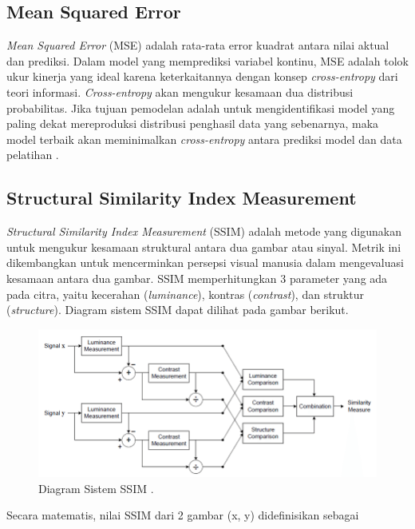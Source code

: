 \subsection{Mean Squared Error}
\label{subsec:MSE}

\emph{Mean Squared Error} (MSE) adalah rata-rata error kuadrat antara nilai aktual dan prediksi. 
Dalam model yang memprediksi variabel kontinu, MSE adalah tolok ukur kinerja yang ideal karena keterkaitannya dengan konsep \emph{cross-entropy} dari teori informasi. 
\emph{Cross-entropy} akan mengukur kesamaan dua distribusi probabilitas. 
Jika tujuan pemodelan adalah untuk mengidentifikasi model yang paling dekat mereproduksi distribusi penghasil data yang sebenarnya, maka model terbaik akan meminimalkan \emph{cross-entropy} antara prediksi model dan data pelatihan \parencite{MSE}. 

\subsection{Structural Similarity Index Measurement}
\label{subsec:SSIM}

\emph{Structural Similarity Index Measurement} (SSIM) adalah metode yang digunakan untuk mengukur kesamaan struktural antara dua gambar atau sinyal. 
Metrik ini dikembangkan untuk mencerminkan persepsi visual manusia dalam mengevaluasi kesamaan antara dua gambar. 
SSIM memperhitungkan 3 parameter yang ada pada citra, yaitu kecerahan (\emph{luminance}), kontras (\emph{contrast}), dan struktur (\emph{structure}). 
Diagram sistem SSIM dapat dilihat pada gambar berikut.

\begin{figure}[ht]
  \centering
  \includegraphics[scale=0.5]{gambar/SSIM.png}
  \caption{Diagram Sistem SSIM \parencite{SSIM}.}
  \label{fig:SSIM}
\end{figure}

Secara matematis, nilai SSIM dari 2 gambar (x, y) didefinisikan sebagai 

